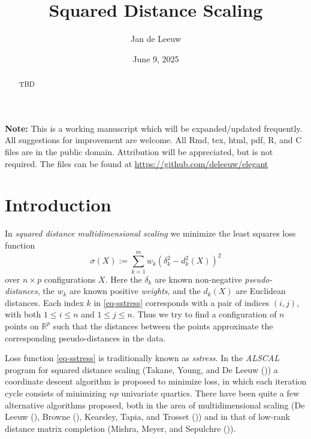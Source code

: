 \documentclass[
  12pt,
  letterpaper,
  DIV=11,
  numbers=noendperiod]{scrartcl}
\title{Squared Distance Scaling}
\author{Jan de Leeuw}
\date{June 9, 2025}
\newcommand{\sectionbreak}{\clearpage}
\renewcommand*\contentsname{Table of contents}
\newcommand\contentsname{Table of contents}
\begin{document}
\maketitle
\begin{abstract}
TBD
\end{abstract}

\renewcommand*\contentsname{Table of contents}
{
\hypersetup{linkcolor=}
\setcounter{tocdepth}{3}
\tableofcontents
}

\textbf{Note:} This is a working manuscript which will be
expanded/updated frequently. All suggestions for improvement are
welcome. All Rmd, tex, html, pdf, R, and C files are in the public
domain. Attribution will be appreciated, but is not required. The files
can be found at \url{https://github.com/deleeuw/elegant}

\sectionbreak

\section{Introduction}\label{introduction}

In \emph{squared distance multidimensional scaling} we minimize the
least squares loss function \begin{equation}
\sigma(X):=\sum_{k=1}^m w_k(\delta_k^2-d_k^2(X))^2\label{eq-sstress}
\end{equation} over \(n\times p\) configurations \(X\). Here the
\(\delta_k\) are known non-negative \emph{pseudo-distances}, the \(w_k\)
are known positive \emph{weights}, and the \(d_k(X)\) are Euclidean
distances. Each index \(k\) in \eqref{eq-sstress} corresponds with a
pair of indices \((i,j)\), with both \(1\leq i\leq n\) and
\(1\leq j\leq n\). Thus we try to find a configuration of \(n\) points
on \(\mathbb{R}^p\) such that the distances between the points
approximate the corresponding pseudo-distances in the data.

Loss function \eqref{eq-sstress} is traditionally known as
\emph{sstress}. In the \emph{ALSCAL} program for squared distance
scaling (Takane, Young, and De Leeuw
()) a coordinate descent
algorithm is proposed to minimize loss, in which each iteration cycle
consists of minimizing \(np\) univariate quartics. There have been quite
a few alternative algorithms proposed, both in the area of
multidimensional scaling (De Leeuw (),
Browne (), Kearsley, Tapia, and Trosset
()) and in that of
low-rank distance matrix completion (Mishra, Meyer, and Sepulchre
()).
\end{document}

